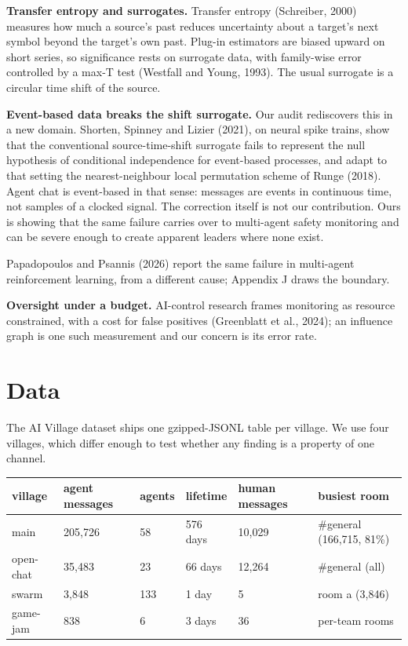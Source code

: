\documentclass[11pt]{article}
\begin{document}
\textbf{Transfer entropy and surrogates.} Transfer entropy (Schreiber, 2000) measures how much a source's past reduces uncertainty about a target's next symbol beyond the target's own past. Plug-in estimators are biased upward on short series, so significance rests on surrogate data, with family-wise error controlled by a max-T test (Westfall and Young, 1993). The usual surrogate is a circular time shift of the source.

\textbf{Event-based data breaks the shift surrogate.} Our audit rediscovers this in a new domain. Shorten, Spinney and Lizier (2021), on neural spike trains, show that the conventional source-time-shift surrogate fails to represent the null hypothesis of conditional independence for event-based processes, and adapt to that setting the nearest-neighbour local permutation scheme of Runge (2018). Agent chat is event-based in that sense: messages are events in continuous time, not samples of a clocked signal. The correction itself is not our contribution. Ours is showing that the same failure carries over to multi-agent safety monitoring and can be severe enough to create apparent leaders where none exist.

Papadopoulos and Psannis (2026) report the same failure in multi-agent reinforcement learning, from a different cause; Appendix J draws the boundary.

\textbf{Oversight under a budget.} AI-control research frames monitoring as resource constrained, with a cost for false positives (Greenblatt et al., 2024); an influence graph is one such measurement and our concern is its error rate.

\section{Data}

The AI Village dataset ships one gzipped-JSONL table per village. We use four villages, which differ enough to test whether any finding is a property of one channel.

\begin{center}
\small
\begin{tabular}{llllll}
\toprule
\textbf{village} & \textbf{agent messages} & \textbf{agents} & \textbf{lifetime} & \textbf{human messages} & \textbf{busiest room} \\
\midrule
main & 205,726 & 58 & 576 days & 10,029 & \#general (166,715, 81\%) \\
open-chat & 35,483 & 23 & 66 days & 12,264 & \#general (all) \\
swarm & 3,848 & 133 & 1 day & 5 & room a (3,846) \\
game-jam & 838 & 6 & 3 days & 36 & per-team rooms \\
\bottomrule
\end{tabular}
\end{center}
\end{document}
